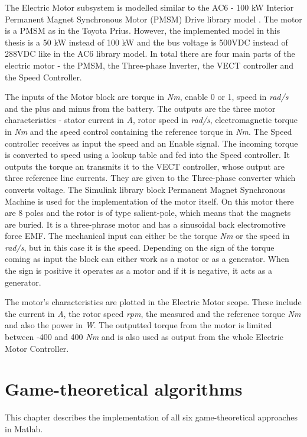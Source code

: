 The Electric Motor subsystem is modelled similar to the AC6 - 100 kW Interior Permanent Magnet Synchronous Motor (PMSM) Drive library model \citep{ac6Matlab}. The motor is a PMSM as in the Toyota Prius. However, the implemented model in this thesis is a 50 kW instead of 100 kW and the bus voltage is 500VDC instead of 288VDC like in the AC6 library model. In total there are four main parts of the electric motor - the PMSM, the Three-phase Inverter, the VECT controller and the Speed Controller. 

The inputs of the Motor block are torque in \textit{Nm}, enable 0 or 1, speed in \textit{rad/s} and the plus and minus from the battery. The outputs are the three motor characteristics - stator current in \textit{A}, rotor speed in \textit{rad/s}, electromagnetic torque in \textit{Nm} and the speed control containing the reference torque in \textit{Nm}. The Speed controller receives as input the speed and an Enable signal. The incoming torque is converted to speed using a lookup table and fed into the Speed controller. It outputs the torque an transmits it to the VECT controller, whose output are three reference line currents. They are given to the Three-phase converter which converts voltage. The Simulink library block Permanent Magnet Synchronous Machine \citep{pmsmMatlab} is used for the implementation of the motor itself. On this motor  there are 8 poles and the rotor is of type salient-pole, which means that the magnets are buried. It is a three-phrase motor and has a sinusoidal back electromotive force EMF. The mechanical input can either be the torque \textit{Nm} or the speed in \textit{rad/s}, but in this case it is the speed. Depending on the sign of the torque coming as input the block can either work as a motor or as a generator. When the sign is positive it operates as a motor and if it is negative, it acts as a generator. 

The motor's characteristics are plotted in the Electric Motor scope. These include the current in \textit{A}, the rotor speed \textit{rpm}, the measured and the reference torque \textit{Nm} and also the power in \textit{W}. The outputted torque from the motor is limited between -400 and 400 \textit{Nm} and is also used as output from the whole Electric Motor Controller.



\section{Game-theoretical algorithms}
This chapter describes the implementation of all six game-theoretical approaches in Matlab.
